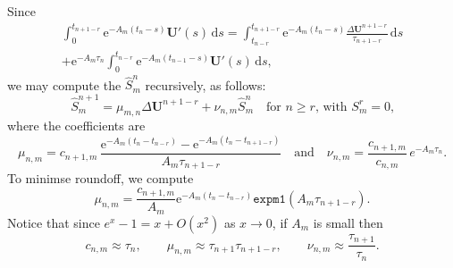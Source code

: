 \documentclass[a4paper,12pt]{article}
\newcommand{\bs}[1]{\boldsymbol{#1}}
\newcommand{\ud}{\mathrm{d}}
\newcommand{\ue}{\mathrm{e}}
\begin{document}
Since
\begin{multline*}
\int_0^{t_{n+1-r}}\ue^{-A_m(t_n-s)}\bs{U}'(s)\,\ud s
    =\int_{t_{n-r}}^{t_{n+1-r}}\ue^{-A_m(t_n-s)}
    \frac{\Delta\bs{U}^{n+1-r}}{\tau_{n+1-r}}\,\ud s\\
    +\ue^{-A_m\tau_n}\int_0^{t_{n-r}}\ue^{-A_m(t_{n-1}-s)}\bs{U}'(s)\,\ud s,
\end{multline*}
we may compute the $\hat S^n_m$ recursively, as follows:
\[
\hat S^{n+1}_m=\mu_{m,n}\Delta\bs{U}^{n+1-r}+\nu_{n,m}\hat S^n_m
\quad\text{for $n\ge r$, with $S^r_m=0$,}
\]
where the coefficients are
\[
\mu_{n,m}=c_{n+1,m}\,\frac{\ue^{-A_m(t_n-t_{n-r})}-\ue^{-A_m(t_n-t_{n+1-r})}}%
{A_m\tau_{n+1-r}}
\quad\text{and}\quad
\nu_{n,m}=\frac{c_{n+1,m}}{c_{n,m}}\,e^{-A_m\tau_n}.
\]
To minimse roundoff, we compute
\[
\mu_{n,m}=\frac{c_{n+1,m}}{A_m}\ue^{-A_m(t_n-t_{n-r})}
    \mathtt{expm1}(A_m\tau_{n+1-r}).
\]
Notice that since $e^x-1=x+O(x^2)$ as $x\to0$, if $A_m$ is small then
\[
c_{n,m}\approx\tau_n,\qquad
\mu_{n,m}\approx\tau_{n+1}\tau_{n+1-r},\qquad
\nu_{n,m}\approx\frac{\tau_{n+1}}{\tau_n}.
\]
\end{document}
